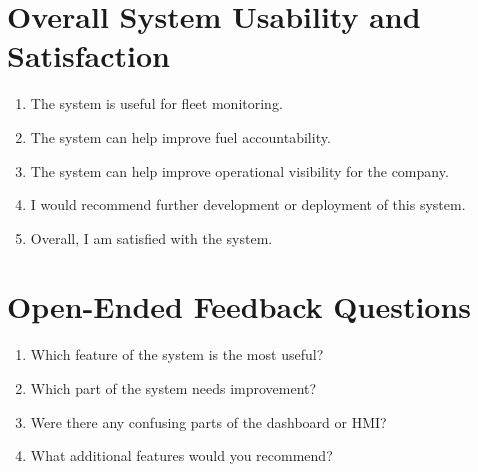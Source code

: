 \section{Overall System Usability and Satisfaction}

\begin{enumerate}
    \item The system is useful for fleet monitoring.
    \item The system can help improve fuel accountability.
    \item The system can help improve operational visibility for the company.
    \item I would recommend further development or deployment of this system.
    \item Overall, I am satisfied with the system.
\end{enumerate}

\section{Open-Ended Feedback Questions}

\begin{enumerate}
    \item Which feature of the system is the most useful?
    \item Which part of the system needs improvement?
    \item Were there any confusing parts of the dashboard or HMI?
    \item What additional features would you recommend?
\end{enumerate}
